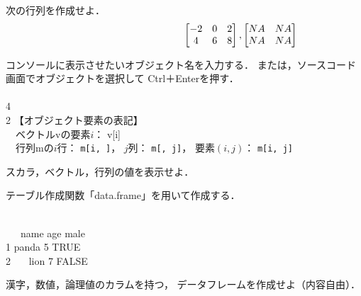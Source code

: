 {
  \MyExercise
  {
    次の行列を作成せよ．
    \vspace{-9mm}
    \[
      \hspace{40mm}
      \begin{bmatrix}
        -2 & 0 & 2\\
         4 & 6 & 8 
      \end{bmatrix}
      , 
      \begin{bmatrix}
        NA & NA\\
        NA & NA 
      \end{bmatrix}
    \]
  }
}

{
  {
    コンソールに表示させたいオブジェクト名を入力する．
    または，ソースコード画面でオブジェクトを選択して
    Ctrl＋Enterを押す．
  }
  \MyColsThree
  {
    \MyConsole
    {
      \\ 
    }
  }
  {
    \MyConsole
    {
      \\  4
    }
  }
  {
    \MyConsole
    {
      \\  2
    }
  }
  【オブジェクト要素の\R 表記】\\
   ~~ベクトルvの要素$i$： v[i]\\
   ~~行列mの$i$行： \texttt{m[i, ]}，
   $j$列： \texttt{m[, j]}，
   要素$(i, j)$： \texttt{m[i, j]}
}

{
  \MyExercise
  {
    スカラ，ベクトル，行列の値を表示せよ．
  }
}

{
  {
    テーブル作成関数「data.frame」を用いて作成する．
  }
  \MyConsole
  {

    \\
       ~~~name age  male\\
     1 panda 5 TRUE\\
     2 ~~~lion 7 FALSE\\
  }
}

{
  \MyExercise
  {
    漢字，数値，論理値のカラムを持つ，
    データフレームを作成せよ（内容自由）．
  }
}

